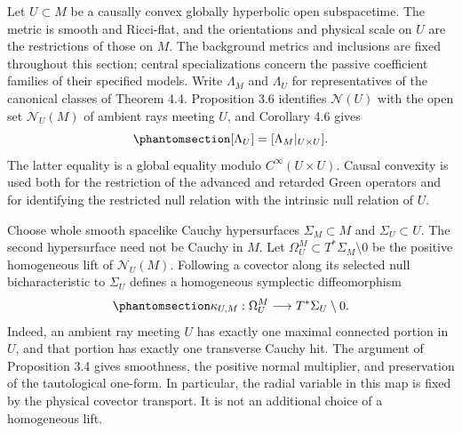 \documentclass[
  english,
  11pt,
  reqno]{amsart}
\begin{document}
Let \(U\subset M\) be a causally convex globally hyperbolic open
subspacetime. The metric is smooth and Ricci-flat, and the orientations
and physical scale on \(U\) are the restrictions of those on \(M\). The
background metrics and inclusions are fixed throughout this section;
central specializations concern the passive coefficient families of
their specified models. Write \(\Lambda_M\) and \(\Lambda_U\) for
representatives of the canonical classes of Theorem 4.4. Proposition 3.6
identifies \(\mathcal N(U)\) with the open set \(\mathcal N_U(M)\) of
ambient rays meeting \(U\), and Corollary 4.6 gives
\begin{equation}\protect\phantomsection\label{eq:relative-native-kernel-restriction}{
[\Lambda_U]=[\Lambda_M|_{U\times U}].
}\end{equation} The latter equality is a global equality modulo
\(C^\infty(U\times U)\). Causal convexity is used both for the
restriction of the advanced and retarded Green operators and for
identifying the restricted null relation with the intrinsic null
relation of \(U\).

Choose whole smooth spacelike Cauchy hypersurfaces \(\Sigma_M\subset M\)
and \(\Sigma_U\subset U\). The second hypersurface need not be Cauchy in
\(M\). Let \(\Omega_U^M\subset T^*\Sigma_M\setminus0\) be the positive
homogeneous lift of \(\mathcal N_U(M)\). Following a covector along its
selected null bicharacteristic to \(\Sigma_U\) defines a homogeneous
symplectic diffeomorphism
\begin{equation}\protect\phantomsection\label{eq:relative-homogeneous-ray-map}{
\kappa_{U,M}:\Omega_U^M\longrightarrow T^*\Sigma_U\setminus0.
}\end{equation} Indeed, an ambient ray meeting \(U\) has exactly one
maximal connected portion in \(U\), and that portion has exactly one
transverse Cauchy hit. The argument of Proposition 3.4 gives smoothness,
the positive normal multiplier, and preservation of the tautological
one-form. In particular, the radial variable in this map is fixed by the
physical covector transport. It is not an additional choice of a
homogeneous lift.
\end{document}
